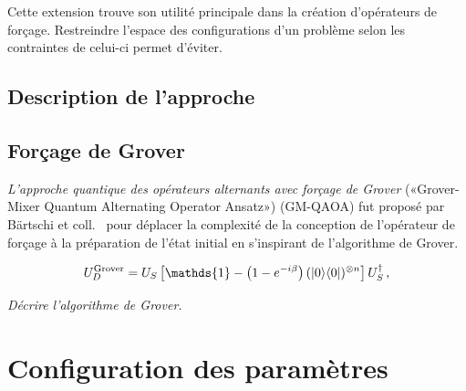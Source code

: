 Cette extension trouve son utilité principale dans la création d'opérateurs de forçage. Restreindre l'espace des configurations d'un problème selon les contraintes de celui-ci permet d'éviter.



\subsection{Description de l'approche}





\subsection{Forçage de Grover}

\textit{L'approche quantique des opérateurs alternants avec forçage de Grover} («Grover-Mixer Quantum Alternating Operator Ansatz») (GM-QAOA) fut proposé par Bärtschi et coll.~\cite{bartschiGroverMixersQAOA2020} pour déplacer la complexité de la conception de l'opérateur de forçage à la préparation de l'état initial en s'inspirant de l'algorithme de Grover. 



\begin{equation}
    U_D^{\mathrm{Grover}} = U_{S}\left[ \mathds{1} -\left(1-e^{-i \beta}\right) (\ket{0}\!\bra{0})^{\otimes n} \right] U_{S}^{\dagger} \,,
\end{equation}

\textcolor{mydarkred}{\textit{Décrire l'algorithme de Grover.}}



\section{Configuration des paramètres}
\label{subsec:initialisation-parametres}

